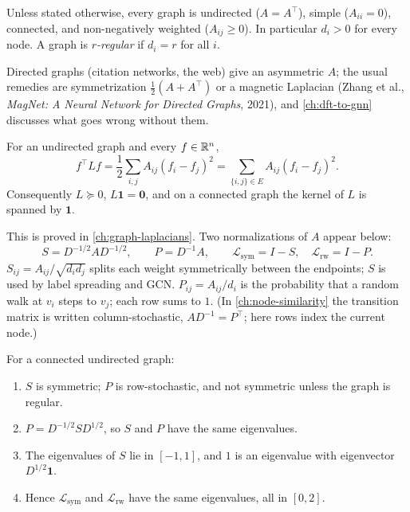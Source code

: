 \begin{notechapter}
\begin{definition}
\label{semi-supervised-graphs:def:standing}
Unless stated otherwise, every graph is undirected ($A = A^\top$), simple ($A_{ii} = 0$), connected, and non-negatively weighted ($A_{ij} \ge 0$). In particular $d_i > 0$ for every node. A graph is \emph{$r$-regular} if $d_i = r$ for all $i$.
\end{definition}

Directed graphs (citation networks, the web) give an asymmetric $A$; the usual remedies are symmetrization $\frac12(A + A^\top)$ or a magnetic Laplacian (Zhang et al., \emph{MagNet: A Neural Network for Directed Graphs}, 2021), and \cref{ch:dft-to-gnn} discusses what goes wrong without them.

\begin{theorem}
\label{semi-supervised-graphs:thm:laplacian_quadratic}
For an undirected graph and every $f \in \mathbb{R}^n$,
\begin{equation}
\label{semi-supervised-graphs:eq:quad_form}
f^\top L f = \frac{1}{2}\sum_{i,j} A_{ij}(f_i - f_j)^2 = \sum_{\{i,j\}\in E} A_{ij}(f_i - f_j)^2 .
\end{equation}
Consequently $L \succeq 0$, $L\mathbf 1 = \mathbf 0$, and on a connected graph the kernel of $L$ is spanned by $\mathbf 1$.
\end{theorem}

This is proved in \cref{ch:graph-laplacians}. Two normalizations of $A$ appear below:
\begin{equation}
S = D^{-1/2}AD^{-1/2}, \qquad P = D^{-1}A, \qquad \mathcal L_{\mathrm{sym}} = I - S, \quad \mathcal L_{\mathrm{rw}} = I - P .
\end{equation}
$S_{ij} = A_{ij}/\sqrt{d_id_j}$ splits each weight symmetrically between the endpoints; $S$ is used by label spreading and GCN. $P_{ij} = A_{ij}/d_i$ is the probability that a random walk at $v_i$ steps to $v_j$; each row sums to $1$. (In \cref{ch:node-similarity} the transition matrix is written column-stochastic, $AD^{-1} = P^\top$; here rows index the current node.)

\begin{proposition}
\label{semi-supervised-graphs:prop:normalized_properties}
For a connected undirected graph:
\begin{enumerate}
    \item $S$ is symmetric; $P$ is row-stochastic, and not symmetric unless the graph is regular.
    \item $P = D^{-1/2}SD^{1/2}$, so $S$ and $P$ have the same eigenvalues.
    \item The eigenvalues of $S$ lie in $[-1, 1]$, and $1$ is an eigenvalue with eigenvector $D^{1/2}\mathbf 1$.
    \item Hence $\mathcal L_{\mathrm{sym}}$ and $\mathcal L_{\mathrm{rw}}$ have the same eigenvalues, all in $[0, 2]$.
\end{enumerate}
\end{proposition}


\end{notechapter}
